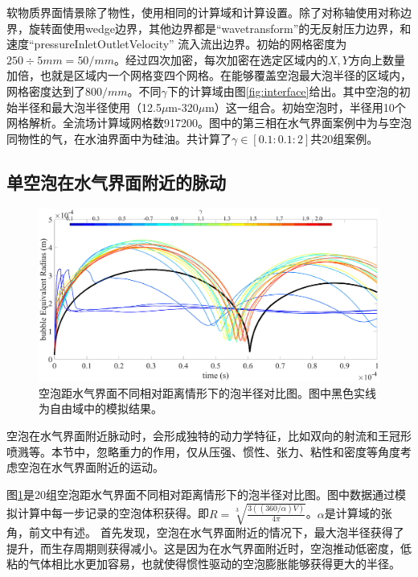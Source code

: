 软物质界面情景除了物性，使用相同的计算域和计算设置。除了对称轴使用对称边界，旋转面使用wedge边界，其他边界都是“wavetransform”的无反射压力边界，和速度“pressureInletOutletVelocity” 流入流出边界。初始的网格密度为$250\div5mm=50/mm$。经过四次加密，每次加密在选定区域内的$X,Y$方向上数量加倍，也就是区域内一个网格变四个网格。在能够覆盖空泡最大泡半径的区域内，网格密度达到了$800/mm$。不同$\gamma$下的计算域由图\ref{fig:interface}给出。其中空泡的初始半径和最大泡半径使用（12.5$\mu$m-320$\mu$m）这一组合。初始空泡时，半径用10个网格解析。全流场计算域网格数917200。图中的第三相在水气界面案例中为与空泡同物性的气，在水油界面中为硅油。共计算了$\gamma\in \left[0.1:0.1:2\right]$共20组案例。


\subsection{单空泡在水气界面附近的脉动}



\begin{figure}[h]
    \centering
    \includegraphics[width=0.9\linewidth]{img/fig3.airradius.eps}
    \caption[空泡距水气界面不同相对距离情形下的泡半径对比图]{空泡距水气界面不同相对距离情形下的泡半径对比图。图中黑色实线为自由域中的模拟结果。}
    \label{fig3.airradius}
\end{figure}

空泡在水气界面附近脉动时，会形成独特的动力学特征，比如双向的射流和王冠形喷溅等。本节中，忽略重力的作用，仅从压强、惯性、张力、粘性和密度等角度考虑空泡在水气界面附近的运动。

图\ref{fig3.airradius}是20组空泡距水气界面不同相对距离情形下的泡半径对比图。图中数据通过模拟计算中每一步记录的空泡体积获得。即$R=\sqrt[3]{\frac{3((360/\alpha)V)}{4\pi}}$。$\alpha$是计算域的张角，前文中有述。
首先发现，空泡在水气界面附近的情况下，最大泡半径获得了提升，而生存周期则获得减小。这是因为在水气界面附近时，空泡推动低密度，低粘的气体相比水更加容易，也就使得惯性驱动的空泡膨胀能够获得更大的半径。

